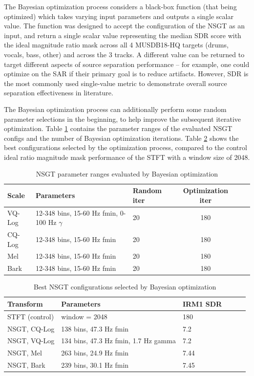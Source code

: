 \documentclass[letter,12pt,notitlepage]{article}
\begin{document}
The Bayesian optimization process considers a black-box function (that being optimized) which takes varying input parameters and outputs a single scalar value. The function was designed to accept the configuration of the NSGT as an input, and return a single scalar value representing the median SDR score with the ideal magnitude ratio mask across all 4 MUSDB18-HQ targets (drums, vocals, bass, other) and across the 3 tracks. A different value can be returned to target different aspects of source separation performance -- for example, one could optimize on the SAR if their primary goal is to reduce artifacts. However, SDR is the most commonly used single-value metric to demonstrate overall source separation effectiveness in literature.

The Bayesian optimization process can additionally perform some random parameter selections in the beginning, to help improve the subsequent iterative optimization. Table \ref{table:nsgtparamsirm} contains the parameter ranges of the evaluated NSGT configs and the number of Bayesian optimization iterations. Table \ref{table:nsgtbayesresults} shows the best configurations selected by the optimization process, compared to the control ideal ratio magnitude mask performance of the STFT with a window size of 2048.

\begin{table}[ht]
	\centering
\begin{tabular}{ |l|l|l|c|c|c| }
	 \hline
	  Scale & Parameters & Random iter & Optimization iter \\
	 \hline
	 \hline
	 VQ-Log & 12-348 bins, 15-60 Hz fmin, 0-100 Hz $\gamma$ & 20 & 180 \\
	 \hline
	 CQ-Log & 12-348 bins, 15-60 Hz fmin & 20 & 180 \\
	 \hline
	 Mel & 12-348 bins, 15-60 Hz fmin & 20 & 180 \\
	 \hline
	 Bark & 12-348 bins, 15-60 Hz fmin & 20 & 180 \\
	 \hline
\end{tabular}
	\caption{NSGT parameter ranges evaluated by Bayesian optimization}
	\label{table:nsgtparamsirm}
\end{table}

\begin{table}[ht]
	\centering
\begin{tabular}{ |l|l|l|c|c|c| }
	 \hline
	  Transform & Parameters & IRM1 SDR \\
	 \hline
	 \hline
	 STFT (control) & window = 2048 & 180 \\
	 \hline
	 NSGT, CQ-Log & 138 bins, 47.3 Hz fmin & 7.2 \\
	 \hline
	 NSGT, VQ-Log & 134 bins, 47.3 Hz fmin, 1.7 Hz gamma & 7.2 \\
	 \hline
	 NSGT, Mel & 263 bins, 24.9 Hz fmin & 7.44 \\
	 \hline
	 NSGT, Bark & 239 bins, 30.1 Hz fmin & 7.45 \\
	 \hline
\end{tabular}
	\caption{Best NSGT configurations selected by Bayesian optimization}
	\label{table:nsgtbayesresults}
\end{table}
\end{document}
